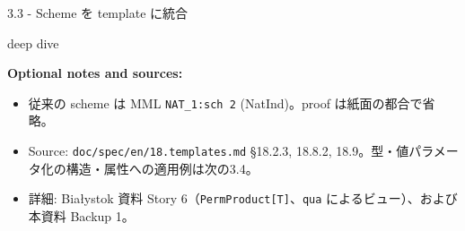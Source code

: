 \documentclass[dvipdfmx,aspectratio=169,11pt]{beamer}
\newcommand{\deepdivetag}{\hfill\colorbox{black!15}{\textcolor{black!65}{\strut\scriptsize\sffamily deep dive}}}
\begin{document}
\begin{frame}[fragile,t]{3.3 - Scheme を template に統合\deepdivetag}
{\begin{itemize}
\end{itemize}
\smallskip
\textbf{Optional notes and sources:}
\begin{itemize}
\setlength{\itemsep}{1pt}
\setlength{\parsep}{0pt}
\setlength{\parskip}{0pt}
\item 従来の scheme は MML \texttt{NAT\_1:sch 2} (NatInd)。proof は紙面の都合で省略。
\item Source: \texttt{doc/spec/en/18.templates.md} §18.2.3, 18.8.2, 18.9。型・値パラメータ化の構造・属性への適用例は次の3.4。
\end{itemize}
\begin{itemize}
\setlength{\itemsep}{1pt}
\setlength{\parsep}{0pt}
\setlength{\parskip}{0pt}
\item 詳細: Bia\l{}ystok 資料 Story 6（\texttt{PermProduct[T]}、\texttt{qua} によるビュー）、および本資料 Backup 1。
\end{itemize}
}
\end{frame}
\end{document}
